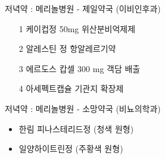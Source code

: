 \documentclass[aspectratio=1610,17pt,xcolor=pdftex,dvipsnames,table,handout]{beamer}
\begin{document}
		\begin{frame} [t,plain]

			\begin{block} { 저녁약 : 메리놀병원 - 제일약국 (이비인후과) }
			\begin{itemize}
			\item 	[1] 케이컵정 50mg  위산분비억제제
			\item 	[2] 알레스틴 정   항알레르기약
			\item 	[3] 에르도스 캅셀 300 mg 객담 배출
			\item 	[4] 아세펙트캡슐 기관지 확장제
			\end{itemize}
			\end{block}			

			\begin{block} { 저녁약 : 메리놀병원 - 소망약국 (비뇨의학과)}
			\begin{itemize}
			\item 	한림 피나스테리드정 (청색 원형)
			\item 	일양하이트린정 (주황색 원형)
			\end{itemize}
			\end{block}			
								
		\end{frame}	 %




%
%
%
%
%								
\end{document}
